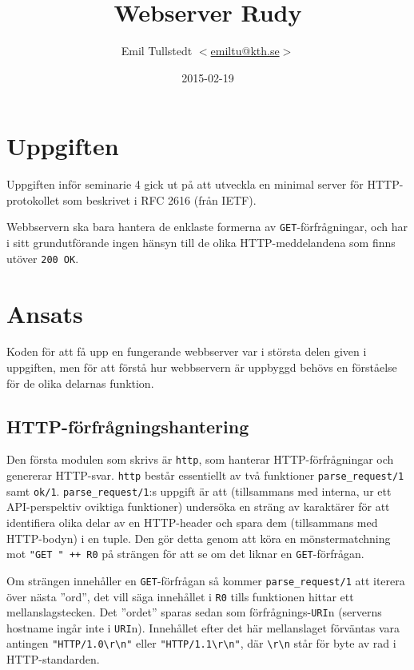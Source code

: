 \documentclass[a4paper, 11pt]{article}
\title{Webserver Rudy}
\author{Emil Tullstedt \href{mailto:emiltu@kth.se}{$<$emiltu@kth.se$>$}}
\date{2015-02-19}
\begin{document}
\maketitle

\section{Uppgiften}
\label{sec:uppgiften}

Uppgiften inför seminarie 4 gick ut på att utveckla en minimal server för HTTP-protokollet som beskrivet i RFC 2616 (från IETF).

Webbservern ska bara hantera de enklaste formerna av \texttt{GET}-förfrågningar, och har i sitt grundutförande ingen hänsyn till de olika HTTP-meddelandena som finns utöver \texttt{200 OK}.

\section{Ansats}
Koden för att få upp en fungerande webbserver var i största delen given i uppgiften, men för att förstå hur webbservern är uppbyggd behövs en förståelse för de olika delarnas funktion.

\subsection{HTTP-förfrågningshantering}
Den första modulen som skrivs är \texttt{http}, som hanterar HTTP-förfrågningar och genererar HTTP-svar. \texttt{http} består essentiellt av två funktioner \texttt{parse_request/1} samt \texttt{ok/1}. \texttt{parse_request/1}:s uppgift är att (tillsammans med interna, ur ett API-perspektiv oviktiga funktioner) undersöka en sträng av karaktärer för att identifiera olika delar av en HTTP-header och spara dem (tillsammans med HTTP-bodyn) i en tuple. Den gör detta genom att köra en mönstermatchning mot \lstinline$"GET " ++ R0$ på strängen för att se om det liknar en \texttt{GET}-förfrågan.

Om strängen innehåller en \texttt{GET}-förfrågan så kommer \texttt{parse_request/1} att iterera över nästa ''ord'', det vill säga innehållet i \texttt{R0} tills funktionen hittar ett mellanslagstecken. Det ''ordet'' sparas sedan som förfrågnings-\texttt{URI}n (serverns hostname ingår inte i \texttt{URI}n). Innehållet efter det här mellanslaget förväntas vara antingen \lstinline$"HTTP/1.0\r\n"$ eller \lstinline$"HTTP/1.1\r\n"$, där \lstinline$\r\n$ står för byte av rad i HTTP-standarden.
\end{document}
